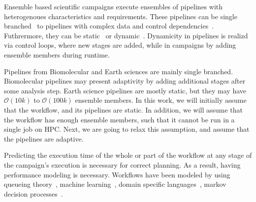 %
%

Ensemble based scientific campaigns execute ensembles of pipelines with 
heterogenoues characteristics and requirements. These pipelines can be single 
branched~\cite{paraskevakos2019workflow,dakka2018high,ramakrishnan_survey,
balasubramanian2018harnessing} to pipelines with complex data and control 
dependencies~\cite{ramakrishnan_survey,deelman2018future}. Futhrermore, they 
can be static~\cite{paraskevakos2019workflow} or dynamic~\cite{dakka2018high,
balasubramanian2018harnessing}. Dynamicity in pipelines is realizd via control 
loops, where new stages are added, while in campaigns by adding ensemble 
members during runtime.

Pipelines from Biomolecular and Earth sciences are mainly single branched. 
Biomolecular pipelines may present adaptivity by adding additional stages after 
some analysis step. Earth science pipelines are mostly static, but they may 
have $\mathcal{O}(10k)$ to $\mathcal{O}(100k)$ ensemble members. In this work, 
we will initially assume that the workflow, and its pipelines are static. In 
addition, we will assume that the workflow has enough ensemble members, such 
that it cannot be run in a single job on HPC. Next, we are going to relax this 
assumption, and assume that the pipelines are adaptive.


Predicting the execution time of the whole or part of the workflow at any stage 
of the campaign's execution is necessary for correct planning. As a result, 
having performance modeling is necessary. Workflows have been modeled by using 
queueing theory~\cite{bao2019performance,yao2019throughput}, machine 
learning~\cite{witt2019predictive,pumma2017runtime}, domain specific 
languages~\cite{deelman2017performance,mandal2016toward}, markov decision 
processes~\cite{jia2005cost}. 

